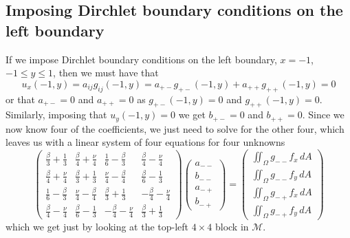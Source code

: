 \documentclass[11pt]{article}
\begin{document}
\subsection{Imposing Dirchlet boundary conditions on the left boundary}
If we impose Dirchlet boundary conditions on the left boundary, $x=-1$, $-1 \le y \le 1$, then we must have that
\begin{equation*}
u_x(-1,y) = a_{ij}g_{ij}(-1,y) = a_{+-}g_{+-}(-1,y) + a_{++}g_{++}(-1,y) = 0
\end{equation*}
or that $a_{+-} = 0$ and $a_{++} = 0$ as $g_{+-}(-1,y) = 0$ and $g_{++}(-1,y) = 0$. Similarly, imposing that $u_y(-1,y) = 0$ we get $b_{+-} = 0$ and $b_{++} = 0$. Since we now know four of the coefficients, we just need to solve for the other four, which leaves us with a linear system of four equations for four unknowns
\begin{equation} \label{eq:q2a4x4}
\begin{pmatrix}
	\frac{\beta}{3} + \frac{1}{3} &   \frac{\beta}{4} + \frac{\nu}{4} & \frac{1}{6} - \frac{\beta}{3} &   \frac{\beta}{4} - \frac{\nu}{4} \\
	\frac{\beta}{4} + \frac{\nu}{4} & \frac{\beta}{3} + \frac{1}{3} &   \frac{\nu}{4} - \frac{\beta}{4} & \frac{\beta}{6} - \frac{1}{3} \\
	\frac{1}{6} - \frac{\beta}{3} &   \frac{\nu}{4} - \frac{\beta}{4} & \frac{\beta}{3} + \frac{1}{3} & - \frac{\beta}{4} - \frac{\nu}{4} \\
	\frac{\beta}{4} - \frac{\nu}{4} & \frac{\beta}{6} - \frac{1}{3} & - \frac{\beta}{4} - \frac{\nu}{4} & \frac{\beta}{3} + \frac{1}{3}
\end{pmatrix}
\begin{pmatrix}
	a_{--} \\
	b_{--} \\
	a_{-+} \\
	b_{-+}
\end{pmatrix}
=
\begin{pmatrix}
	\iint_\Omega g_{--} f_x \, dA \\
	\iint_\Omega g_{--} f_y \, dA \\
	\iint_\Omega g_{-+} f_x \, dA \\
	\iint_\Omega g_{-+} f_y \, dA
\end{pmatrix}
\end{equation}
which we get just by looking at the top-left $4\times4$ block in $\mathcal{M}$.
\end{document}
